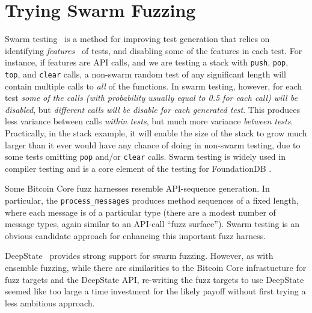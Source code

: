 \section{Trying Swarm Fuzzing}

Swarm testing~\cite{ISSTA12} is a method for improving test
generation that relies on identifying \emph{features}~\cite{groce2013help} of tests, and
disabling some of the features in each test.  For instance, if features are
API calls, and we are testing a stack with {\tt push}, {\tt pop}, {\tt
  top}, and {\tt clear} calls, a non-swarm random test of any
significant length will contain multiple calls to \emph{all} of
the functions.  In swarm testing, however, for each test \emph{some of the calls
(with probability usually equal to 0.5 for each call) will be
disabled}, but \emph{different calls will be disable for each generated
test}.  This produces less variance between calls \emph{within tests}, but
much more variance \emph{between tests}.  Practically, in the stack
example, it will enable the size of the stack to grow much larger than
it ever would have any chance of doing in non-swarm testing, due to
some tests omitting {\tt pop} and/or {\tt clear} calls.  Swarm testing
is widely used in compiler testing
\cite{le2014compiler} and is a core element of the
testing for FoundationDB \cite{zhou2021foundationdb}.

Some Bitcoin Core fuzz harnesses resemble API-sequence generation.  In particular, the {\tt process\_messages} produces method sequences of a fixed length, where each message is of a particular type (there are a modest number of message types, again similar to an API-call ``fuzz surface'').  Swarm testing is an obvious candidate approach for enhancing this important fuzz harness.

DeepState~\cite{goodman2018deepstate} provides strong support for swarm fuzzing.  However, as with ensemble fuzzing, while there are similarities to the Bitcoin Core infrastucture for fuzz targets and the DeepState API, re-writing the fuzz targets to use DeepState seemed like too large a time investment for the likely payoff without first trying a less ambitious approach.